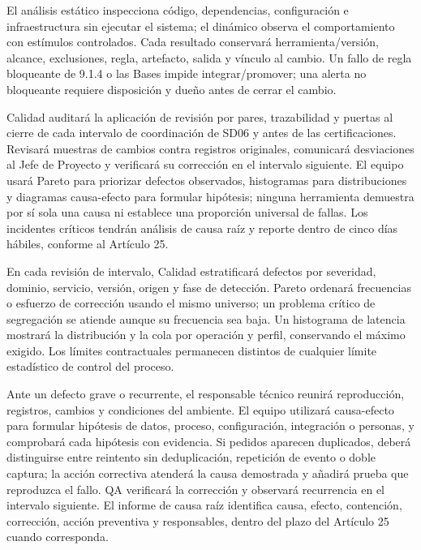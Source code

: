 \documentclass[11pt]{article}
\begin{document}
El análisis estático inspecciona código, dependencias, configuración e infraestructura sin ejecutar el sistema; el dinámico observa el comportamiento con estímulos controlados. Cada resultado conservará herramienta/versión, alcance, exclusiones, regla, artefacto, salida y vínculo al cambio. Un fallo de regla bloqueante de 9.1.4 o las Bases impide integrar/promover; una alerta no bloqueante requiere disposición y dueño antes de cerrar el cambio.

Calidad auditará la aplicación de revisión por pares, trazabilidad y puertas al cierre de cada intervalo de coordinación de SD06 y antes de las certificaciones. Revisará muestras de cambios contra registros originales, comunicará desviaciones al Jefe de Proyecto y verificará su corrección en el intervalo siguiente. El equipo usará Pareto para priorizar defectos observados, histogramas para distribuciones y diagramas causa-efecto para formular hipótesis; ninguna herramienta demuestra por sí sola una causa ni establece una proporción universal de fallas. Los incidentes críticos tendrán análisis de causa raíz y reporte dentro de cinco días hábiles, conforme al Artículo 25.

En cada revisión de intervalo, Calidad estratificará defectos por severidad, dominio, servicio, versión, origen y fase de detección. Pareto ordenará frecuencias o esfuerzo de corrección usando el mismo universo; un problema crítico de segregación se atiende aunque su frecuencia sea baja. Un histograma de latencia mostrará la distribución y la cola por operación y perfil, conservando el máximo exigido. Los límites contractuales permanecen distintos de cualquier límite estadístico de control del proceso.

Ante un defecto grave o recurrente, el responsable técnico reunirá reproducción, registros, cambios y condiciones del ambiente. El equipo utilizará causa-efecto para formular hipótesis de datos, proceso, configuración, integración o personas, y comprobará cada hipótesis con evidencia. Si pedidos aparecen duplicados, deberá distinguirse entre reintento sin deduplicación, repetición de evento o doble captura; la acción correctiva atenderá la causa demostrada y añadirá prueba que reproduzca el fallo. QA verificará la corrección y observará recurrencia en el intervalo siguiente. El informe de causa raíz identifica causa, efecto, contención, corrección, acción preventiva y responsables, dentro del plazo del Artículo 25 cuando corresponda.
\end{document}
